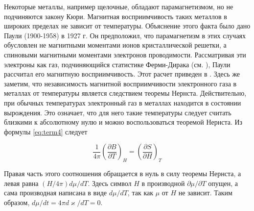 \documentclass[12pt]{article}
\begin{document}
  Некоторые металлы, например щелочные, обладают парамагнетизмом, но не подчиняются закону Кюри. Магнитная восприимчивость таких металлов в широких пределах не зависит от температуры. Объяснение этого факта было дано Паули (1900-1958) в 1927 г. Он предположил, что парамагнетизм в этих случаях обусловлен не магнитными моментами ионов кристаллической решетки, а спиновыми магнитными моментами электронов проводимости. Рассматривая эти электроны как газ, подчиняющийся статистике Ферми-Дирака (см. \cite{sivykhin2}), Паули рассчитал его магнитную восприимчивость. Этот расчет приведен в \cite[\S99]{sivykhin3}. Здесь же заметим, что независимость магнитной восприимчивости электронного газа в металлах от температуры является следствием теоремы Нернста. Действительно, при обычных температурах электронный газ в металлах находится в состоянии вырождения. Это означает, что для него такие температуры следует считать близкими к абсолютному нулю и можно воспользоваться теоремой Нернста. Из формулы \ref{eq:term4} следует

  \begin{equation}
  \frac{1}{4 \pi}\left(\frac{\partial B}{\partial T}\right)_H=\left(\frac{\partial S}{\partial H}\right)_T
  \end{equation}

  Правая часть этого соотношения обращается в нуль в силу теоремы Нернста, а левая равна $(H / 4 \pi) d \mu / d T$. Здесь символ $H$ в производной $\partial \mu / \partial T$ опущен, а сама производная написана в виде $d \mu / d T$, так как $\mu$ от $H$ не зависит. Таким образом, $d \mu / d t=4 \pi d \varkappa / d T=0$.

  
  
\end{document}

